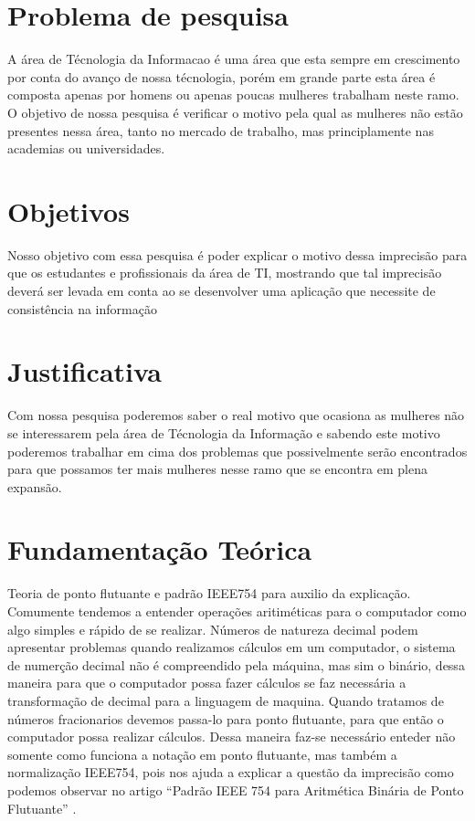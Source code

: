 \documentclass[
	12pt,				%
	oneside,			%
	a4paper,			%
	english,			%
	french,				%
	spanish,			%
	brazil,				%
	]{abntex2}
\begin{document}
\nocite{nata}

\chapter{Problema de pesquisa}
A área de Técnologia da Informacao é uma área que esta sempre em crescimento por conta 
do avanço de nossa técnologia, porém em grande parte esta área é composta apenas por homens ou
apenas poucas mulheres trabalham neste ramo. O objetivo de nossa pesquisa é verificar o motivo pela qual
as mulheres não estão presentes nessa área, tanto no mercado de trabalho, mas principlamente nas academias ou universidades.


\chapter{Objetivos}
Nosso objetivo com essa pesquisa é poder explicar o motivo dessa imprecis\~{a}o para que os estudantes e profissionais da área de TI, mostrando que tal imprecis\~{a}o deverá ser levada em conta ao se desenvolver uma aplicaç\~{a}o que necessite de consistência na informaç\~{a}o  
\chapter{Justificativa}
Com nossa pesquisa poderemos saber o real motivo que ocasiona as mulheres n\~{a}o se interessarem pela área de Técnologia da Informaç\~{a}o e sabendo este motivo poderemos trabalhar em cima dos problemas que possivelmente ser\~{a}o encontrados para que possamos ter mais mulheres nesse ramo que se encontra em plena expans\~{a}o.
\chapter{Fundamentaç\~{a}o Teórica}
Teoria de ponto flutuante e padrão IEEE754 para auxilio da explicação.
Comumente tendemos a entender operações aritiméticas para o computador como algo simples e  rápido de se realizar. Números de natureza decimal podem apresentar problemas quando realizamos cálculos em um computador, o sistema de numerção decimal não é compreendido pela máquina,  mas sim o binário, dessa maneira  para que o computador possa fazer cálculos se faz necessária a transformação de decimal para a linguagem de maquina. Quando tratamos de números fracionarios devemos passa-lo para ponto flutuante, para que então o computador possa realizar cálculos.  Dessa maneira faz-se necessário enteder não somente como funciona a notação em ponto flutuante, mas também a normalização IEEE754, pois nos ajuda a explicar a questão da imprecisão como podemos observar no artigo “Padrão IEEE 754 para Aritmética Binária de Ponto Flutuante” \cite{viana1999padrao}.
 
\end{document}
